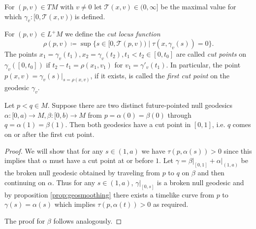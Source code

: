 For $(p,v)\in TM$ with $v\neq 0$ let $\mathcal{T}(x,v)\in(0,\infty]$ be the maximal value for which $\gamma_v:[0,\mathcal{T}(x,v))$ is defined.

\begin{definition}\label{def:cutpoint}
For $(p,v)\in L^+M$ we define the \emph{cut locus function}
\[
\rho(p,v)\coloneqq\sup\{s\in[0,\mathcal{T}(p,v)) \mid \tau(x,\gamma_v(s))=0\}.
\]
The points $x_1=\gamma_v(t_1), x_2=\gamma_v(t_2), t_1<t_2 \in [0,t_0]$ are called \emph{cut points} on $\gamma_v([0,t_0])$ if $t_2-t_1 = \rho(x_1,v_1)$ for $v_1 = \gamma'_v(t_1)$. In particular, the point $p(x,v) = \gamma_v(s)\rvert_{s=\rho(x,v)}$, if it exists, is called the \emph{first cut point} on the geodesic $\gamma_v$.
\end{definition}

\begin{lemma}
Let $p<q\in M$. Suppose there are two distinct future-pointed null geodesics $\alpha:[0,a)\to M, \beta:[0,b)\to M$ from $p=\alpha(0)=\beta(0)$ through $q=\alpha(1)=\beta(1)$. Then both geodesics have a cut point in $[0,1]$, i.e. $q$ comes on or after the first cut point.
\end{lemma}
\begin{proof}
We will show that for any $s\in (1,a)$ we have $\tau(p,\alpha(s))>0$ since this implies that $\alpha$ must have a cut point at or before $1$. Let $\gamma=\beta\rvert_{[0,1]}+\alpha\rvert_{(1,a)}$ be the broken null geodesic obtained by traveling from $p$ to $q$ on $\beta$ and then continuing on $\alpha$. Thus for any $s\in(1,a)$, $\gamma\rvert_{[0,s]}$ is a broken null geodesic and by proposition \ref{prop:geosmoothing} there exists a timelike curve from $p$ to $\gamma(s)=\alpha(s)$ which implies $\tau(p,\alpha(t))>0$ as required.

The proof for $\beta$ follows analogously.
\end{proof}



